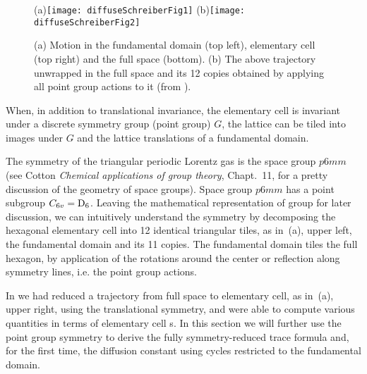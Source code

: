 


\begin{figure}[htbp]
  \begin{center}
    (a)\;\texttt{[image: diffuseSchreiberFig1]}
    (b)\texttt{[image: diffuseSchreiberFig2]}
  \end{center}
  \caption[]{\label{fig-schrieberFig12}
  (a) Motion in the fundamental domain (top left), elementary cell (top
      right) and the full space (bottom).
  (b) The above trajectory unwrapped in the full space and its 12 copies
    obtained by applying all point group  actions to it (from
    ).
  }
\end{figure}

When, in addition to translational invariance, the elementary cell is
invariant under a discrete symmetry group (point group) $G$, the lattice
can be tiled into images under $G$ and the lattice translations of a
fundamental domain.

The symmetry of the triangular periodic Lorentz gas is the space group
$p6mm$ (see Cotton {\em Chemical applications of group
theory},  Chapt.~11, for a pretty discussion of the geometry of space
groups). Space group $p6mm$ has a point subgroup $C_{6v}=\textrm{D}_{6}$. Leaving
the mathematical representation of group for later discussion, we can
intuitively understand the symmetry by decomposing the hexagonal
elementary cell into 12 identical triangular tiles, as in
\,(a), upper left, the fundamental domain and
its 11 copies. The fundamental domain tiles the full hexagon, by
application of the  rotations around the center or reflection along
symmetry lines, i.e. the point group actions.

In  we had reduced a trajectory from full space to
elementary cell, as in \,(a), upper right,
using the translational symmetry, and were able to compute various
quantities in terms of elementary cell \po s. In this section we will
further use the point group symmetry to derive the fully symmetry-reduced
trace formula and, for the first time, the diffusion constant using
cycles restricted to the fundamental domain.

